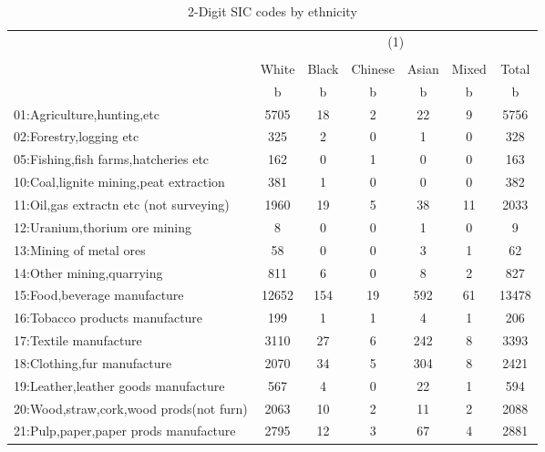 {
\def\sym#1{\ifmmode^{#1}\else\(^{#1}\)\fi}
\begin{longtable}{l*{6}{c}}
\caption{2-Digit SIC codes by ethnicity}\\
\hline\hline\endfirsthead\hline\endhead\hline\endfoot\endlastfoot
          &\multicolumn{6}{c}{(1)}                                    \\
          &\multicolumn{6}{c}{}                                       \\
          &    White&    Black&  Chinese&    Asian&    Mixed&    Total\\
          &        b&        b&        b&        b&        b&        b\\
\hline
01:Agriculture,hunting,etc&     5705&       18&        2&       22&        9&     5756\\
02:Forestry,logging etc&      325&        2&        0&        1&        0&      328\\
05:Fishing,fish farms,hatcheries etc&      162&        0&        1&        0&        0&      163\\
10:Coal,lignite mining,peat extraction&      381&        1&        0&        0&        0&      382\\
11:Oil,gas extractn etc (not surveying)&     1960&       19&        5&       38&       11&     2033\\
12:Uranium,thorium ore mining&        8&        0&        0&        1&        0&        9\\
13:Mining of metal ores&       58&        0&        0&        3&        1&       62\\
14:Other mining,quarrying&      811&        6&        0&        8&        2&      827\\
15:Food,beverage manufacture&    12652&      154&       19&      592&       61&    13478\\
16:Tobacco products manufacture&      199&        1&        1&        4&        1&      206\\
17:Textile manufacture&     3110&       27&        6&      242&        8&     3393\\
18:Clothing,fur manufacture&     2070&       34&        5&      304&        8&     2421\\
19:Leather,leather goods manufacture&      567&        4&        0&       22&        1&      594\\
20:Wood,straw,cork,wood prods(not furn)&     2063&       10&        2&       11&        2&     2088\\
21:Pulp,paper,paper prods manufacture&     2795&       12&        3&       67&        4&     2881\\

\end{longtable}}
